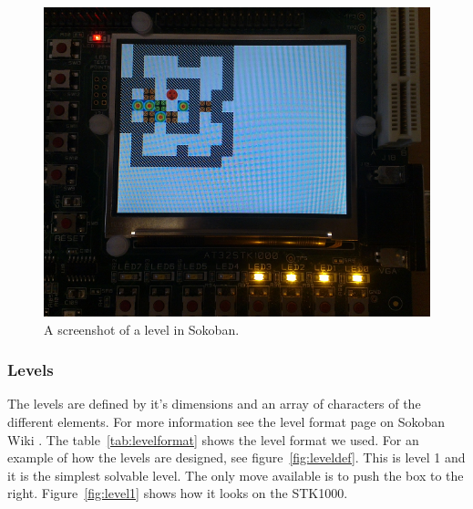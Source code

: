 \documentclass[a4paper,11pt]{article}
\begin{document}
\begin{figure}[H]
\centering
\includegraphics[scale=0.4]{images/sokobanscreen.png}
\caption{A screenshot of a level in Sokoban.}
\label{fig:sokobanscreen}
\end{figure}

\subsubsection{Levels}
The levels are defined by it's dimensions and an array of characters of the different elements. For more information see the level format page on Sokoban Wiki \cite{sokobanlevel}. The  table~\ref{tab:levelformat} shows the level format we used. For an example of how the levels are designed, see figure~\ref{fig:leveldef}. This is level 1 and it is the simplest solvable level. The only move available is to push the box to the right. Figure~\ref{fig:level1} shows how it looks on the STK1000.
\end{document}
